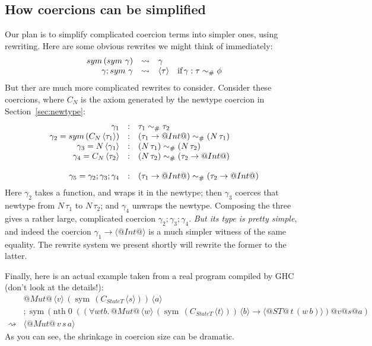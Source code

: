 \documentclass[a4paper,UKenglish]{lipics}
\makeatletter
\newcommand{\psim}{\mathrel{\sim_{\tiny \#}}}
\newcommand{\sym}[1]{\mathop{sym}\, #1}
\newcommand{\nth}[2]{\mathop{nth} #1\;#2}
\newcommand{\inst}[2]{#1@#2}
\newcommand{\refl}[1]{\langle#1\rangle}  %
\newcommand{\rsa}[1]{\rightsquigarrow_{#1}}
\makeatother
\begin{document}
\subsection{How coercions can be simplified}

Our plan is to simplify complicated coercion terms into simpler ones, using rewriting. 
Here are some obvious rewrites we might think of immediately:
$$
\begin{array}{rcll}
\sym{(\sym{\gamma})} & \rsa{} & \gamma \\
\gamma ; \sym{\gamma} & \rsa{} & \refl{\tau} & \text{if}\,\gamma : \tau \psim \phi 
\end{array}
$$
But ther are much more complicated rewrites to consider.
Consider these coercions, where $C_N$ is the axiom generated by the newtype coercion in 
Section~\ref{sec:newtype}:
$$
\begin{array}{rcl}
\gamma_1 & : & \tau_1 \psim \tau_2 \\
\gamma_2 = \sym{(C_N\,\refl{\tau_1})} & : & (\tau_1 \rightarrow @Int@) \psim (N\,\tau_1) \\
\gamma_3 = N\,\refl{\gamma_1} & : & (N\,\tau_1) \psim (N\,\tau_2) \\
\gamma_4 = C_N\,\refl{\tau_2} & : & (N\,\tau_2) \psim (\tau_2 \rightarrow @Int@) \\
\\
\gamma_5 = \gamma_2 ; \gamma_3 ; \gamma_4 & : & (\tau_1 \rightarrow @Int@) \psim (\tau_2 \rightarrow @Int@)
\end{array}
$$
Here $\gamma_2$ takes a function, and wraps it in the newtype; then $\gamma_3$ coerces that newtype from
$N\,\tau_1$ to $N\,\tau_2$; and $\gamma_4$ unwraps the newtype.
Composing the three gives a rather large, complicated 
coercion $\gamma_2 ; \gamma_3 ; \gamma_4$.  \emph{But its type
is pretty simple}, and indeed the coercion $\gamma_1 \to \refl{@Int@}$ is a much simpler
witness of the same equality.  The rewrite system we present shortly will rewrite 
the former to the latter.

Finally, here is an actual example taken from a real program compiled by GHC
(don't look at the details!):
$$
\begin{array}{ll}
& @Mut@\, \refl{v}\, (\sym{(C_{StateT} \, \refl{s})})\, \refl{a} \\
& ; \sym{(\nth{0}{(\inst{\inst{\inst{(\forall 
    w %
    t %
    b %
.\,
                   @Mut@\, \refl{w}\, (\sym{(C_{StateT}\, \refl{t})})\, \refl{b}
                   \rightarrow \refl{@ST@\, t\,(w\, b)})}{v}}{s}}{a})}} \\
\rsa{} & \refl{@Mut@\, v\,s\,a}
\end{array}
$$
As you can see, the shrinkage in coercion size can be dramatic.
\end{document}
